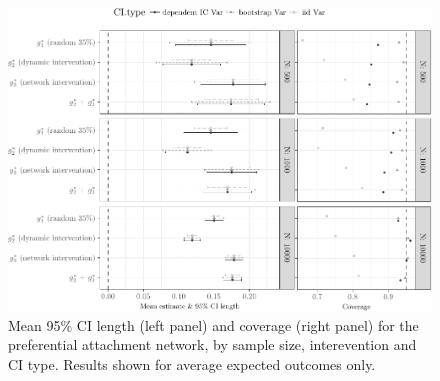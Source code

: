 \documentclass[english]{article}\usepackage[]{graphicx}\usepackage[]{color}
\makeatletter
\def\maxwidth{ %
  \ifdim\Gin@nat@width>\linewidth
    \linewidth
  \else
    \Gin@nat@width
  \fi
}
\newenvironment{knitrout}{}{} %
\theoremstyle{plain}
\theoremstyle{plain}
\makeatother
\begin{document}
\begin{knitrout}\footnotesize
{}\color{fgcolor}\begin{figure}

{\centering \includegraphics[width=\maxwidth]{TablesFigs/knitR-CIres_EY_prefattach_bw-1} 

}

\caption[Mean 95\% CI length (left panel) and coverage (right panel) for the preferential attachment network, by sample size, interevention and CI type]{Mean 95\% CI length (left panel) and coverage (right panel) for the preferential attachment network, by sample size, interevention and CI type. Results shown for average expected outcomes only.}\label{fig:CIres.EY.prefattach.bw}
\end{figure}


\end{knitrout}
\end{document}
